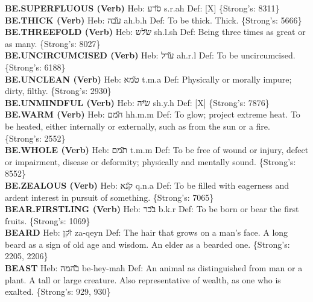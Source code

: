 {\textbf{BE.SUPERFLUOUS (Verb)} Heb: {\large\H סרע} s.r.ah Def: {[}X{]} \{Strong's: 8311\}\hfill{}\\

\textbf{BE.THICK (Verb)} Heb: {\large\H עבה} ah.b.h Def: To be thick. Thick. \{Strong's: 5666\}\hfill{}\\

\textbf{BE.THREEFOLD (Verb)} Heb: {\large\H שלש} sh.l.sh Def: Being three times as great or as many. \{Strong's: 8027\}\hfill{}\\

\textbf{BE.UNCIRCUMCISED (Verb)} Heb: {\large\H ערל} ah.r.l Def: To be uncircumcised. \{Strong's: 6188\}\hfill{}\\

\textbf{BE.UNCLEAN (Verb)} Heb: {\large\H טמא} t.m.a Def: Physically or morally impure; dirty, filthy. \{Strong's: 2930\}\hfill{}\\

\textbf{BE.UNMINDFUL (Verb)} Heb: {\large\H שיה} sh.y.h Def: {[}X{]} \{Strong's: 7876\}\hfill{}\\

\textbf{BE.WARM (Verb)} Heb: {\large\H חמם} hh.m.m Def: To glow; project extreme heat. To be heated, either internally or externally, such as from the sun or a fire. \{Strong's: 2552\}\hfill{}\\

\textbf{BE.WHOLE (Verb)} Heb: {\large\H תמם} t.m.m Def: To be free of wound or injury, defect or impairment, disease or deformity; physically and mentally sound. \{Strong's: 8552\}\hfill{}\\

\textbf{BE.ZEALOUS (Verb)} Heb: {\large\H קנא} q.n.a Def: To be filled with eagerness and ardent interest in pursuit of something. \{Strong's: 7065\}\hfill{}\\

\textbf{BEAR.FIRSTLING (Verb)} Heb: {\large\H בכר} b.k.r Def: To be born or bear the first fruits. \{Strong's: 1069\}\hfill{}\\

\textbf{BEARD} Heb: {\large\H זקן} za-qeyn Def: The hair that grows on a man's face. A long beard as a sign of old age and wisdom. An elder as a bearded one. \{Strong's: 2205, 2206\}\hfill{}\\

\textbf{BEAST} Heb: {\large\H בהמה} be-hey-mah Def: An animal as distinguished from man or a plant. A tall or large creature. Also representative of wealth, as one who is exalted. \{Strong's: 929, 930\}\hfill{}\\

}
